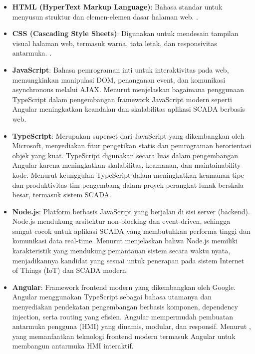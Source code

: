 \begin{itemize}
    \item \textbf{HTML (HyperText Markup Language)}: Bahasa standar untuk menyusun struktur dan elemen-elemen dasar halaman web. \textcite{bhanarkar2023responsive}.
    
    \item \textbf{CSS (Cascading Style Sheets)}: Digunakan untuk mendesain tampilan visual halaman web, termasuk warna, tata letak, dan responsivitas antarmuka. \textcite{singh2014responsive}.
    
    \item \textbf{JavaScript}: Bahasa pemrograman inti untuk interaktivitas pada web, memungkinkan manipulasi DOM, penanganan event, dan komunikasi asynchronous melalui AJAX. Menurut \textcite{emmanni2025typescript} menjelaskan bagaimana penggunaan TypeScript dalam pengembangan framework JavaScript modern seperti Angular meningkatkan keandalan dan skalabilitas aplikasi SCADA berbasis web.
    
    \item \textbf{TypeScript}: Merupakan superset dari JavaScript yang dikembangkan oleh Microsoft, menyediakan fitur pengetikan statis dan pemrograman berorientasi objek yang kuat. TypeScript digunakan secara luas dalam pengembangan Angular karena meningkatkan skalabilitas, keamanan, dan maintainability kode. Menurut \textcite{scarsbrook2023typescript} keunggulan TypeScript dalam meningkatkan keamanan tipe dan produktivitas tim pengembang dalam proyek perangkat lunak berskala besar, termasuk sistem SCADA.
    
    \item \textbf{Node.js}: Platform berbasis JavaScript yang berjalan di sisi server (backend). Node.js mendukung arsitektur non-blocking dan event-driven, sehingga sangat cocok untuk aplikasi SCADA yang membutuhkan performa tinggi dan komunikasi data real-time. Menurut \textcite{ancona2018nodejs} menjelaskan bahwa Node.js memiliki karakteristik yang mendukung pemantauan sistem secara waktu nyata, menjadikannya kandidat yang sesuai untuk penerapan pada sistem Internet of Things (IoT) dan SCADA modern.
    
    \item \textbf{Angular}: Framework frontend modern yang dikembangkan oleh Google. Angular menggunakan TypeScript sebagai bahasa utamanya dan menyediakan pendekatan pengembangan berbasis komponen, dependency injection, serta routing yang efisien. Angular mempermudah pembuatan antarmuka pengguna (HMI) yang dinamis, modular, dan responsif. Menurut \textcite{jointjs2023scada}, yang memanfaatkan teknologi frontend modern termasuk Angular untuk membangun antarmuka HMI interaktif.

\end{itemize}

